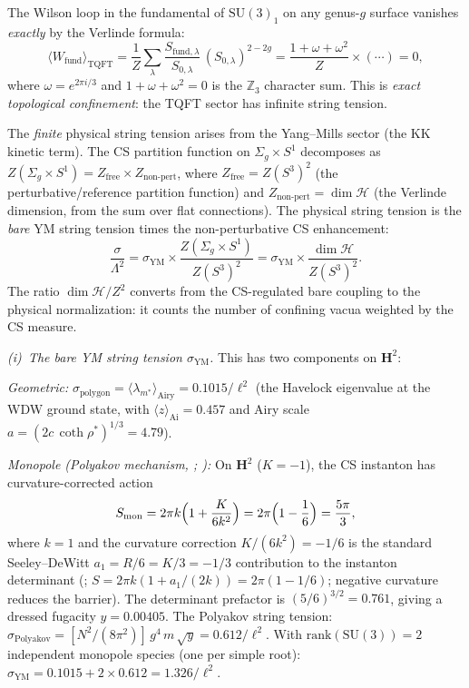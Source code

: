 \begin{derivation}
\label{der:string-tension}
The Wilson loop in the fundamental of $\mathrm{SU}(3)_1$
on any genus-$g$ surface vanishes \emph{exactly}
by the Verlinde formula:
\begin{equation}\label{eq:verlinde-wilson}
  \langle W_{\mathrm{fund}}\rangle_{\mathrm{TQFT}}
  = \frac{1}{Z}\sum_\lambda
    \frac{S_{\mathrm{fund},\lambda}}{S_{0,\lambda}}
    \,(S_{0,\lambda})^{2-2g}
  = \frac{1+\omega+\omega^2}{Z} \times (\cdots) = 0,
\end{equation}
where $\omega = e^{2\pi i/3}$ and $1+\omega+\omega^2 = 0$
is the $\mathbb{Z}_3$ character sum.
This is \emph{exact topological confinement}: the TQFT
sector has infinite string tension.

The \emph{finite} physical string tension arises from
the Yang--Mills sector (the KK kinetic term).
The CS partition function on $\Sigma_g \times S^1$
decomposes as
$Z(\Sigma_g \times S^1) = Z_{\mathrm{free}} \times
Z_{\mathrm{non\text{-}pert}}$,
where $Z_{\mathrm{free}} = Z(S^3)^2$
(the perturbative/reference partition function)
and $Z_{\mathrm{non\text{-}pert}} = \dim\mathcal{H}$
(the Verlinde dimension, from the sum over flat connections).
The physical string tension is the \emph{bare} YM string
tension times the non-perturbative CS enhancement:
\begin{equation}\label{eq:string-tension}
  \frac{\sigma}{\Lambda^2}
  = \sigma_{\mathrm{YM}}
    \times \frac{Z(\Sigma_g \times S^1)}{Z(S^3)^2}
  = \sigma_{\mathrm{YM}}
    \times \frac{\dim\mathcal{H}}{Z(S^3)^2}.
\end{equation}
The ratio $\dim\mathcal{H}/Z^2$ converts from the
CS-regulated bare coupling to the physical normalization:
it counts the number of confining vacua weighted by the
CS measure.

\emph{(i)~The bare YM string tension $\sigma_{\mathrm{YM}}$.}
This has two components on $\mathbf{H}^2$:

\emph{Geometric:}
$\sigma_{\mathrm{polygon}}
= \langle\lambda_{m^*}\rangle_{\mathrm{Airy}}
= 0.1015/\ell^2$
(the Havelock eigenvalue at the WDW ground state,
with $\langle z\rangle_{\mathrm{Ai}} = 0.457$
and Airy scale $a = (2c\,\coth\rho^*)^{1/3} = 4.79$).

\emph{Monopole (Polyakov mechanism,
\citealt{Polyakov1977}; \citealt{AHW1982}):}
On $\mathbf{H}^2$ ($K = -1$), the CS instanton
has curvature-corrected action
\[
  S_{\mathrm{mon}} = 2\pi k\Bigl(1 + \frac{K}{6k^2}\Bigr)
  = 2\pi\Bigl(1 - \frac{1}{6}\Bigr) = \frac{5\pi}{3},
\]
where $k = 1$ and the curvature correction
$K/(6k^2) = -1/6$ is the standard Seeley--DeWitt
$a_1 = R/6 = K/3 = -1/3$ contribution
to the instanton determinant
(\citealt{Polyakov1977};
$S = 2\pi k(1 + a_1/(2k)) = 2\pi(1 - 1/6)$;
negative curvature reduces the barrier).
The determinant prefactor is $(5/6)^{3/2} = 0.761$,
giving a dressed fugacity $y = 0.00405$.
The Polyakov string tension:
$\sigma_{\mathrm{Polyakov}}
= [N^2/(8\pi^2)]\,g^4\,m\,\sqrt{y} = 0.612/\ell^2$.
With $\mathrm{rank}(\mathrm{SU}(3)) = 2$ independent
monopole species (one per simple root):
$\sigma_{\mathrm{YM}}
= 0.1015 + 2 \times 0.612 = 1.326/\ell^2$.


\end{derivation}
